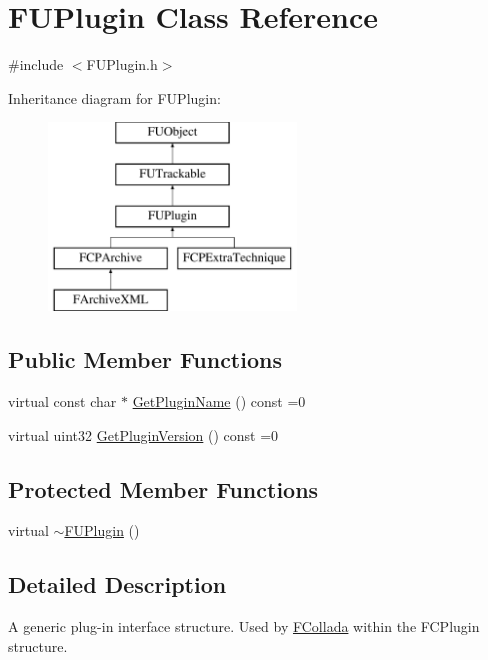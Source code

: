 \hypertarget{classFUPlugin}{
\section{FUPlugin Class Reference}
\label{classFUPlugin}
}


{\ttfamily \#include $<$FUPlugin.h$>$}

Inheritance diagram for FUPlugin:\begin{figure}[H]
\begin{center}
\leavevmode
\includegraphics[height=5.000000cm]{classFUPlugin}
\end{center}
\end{figure}
\subsection*{Public Member Functions}
\begin{DoxyCompactItemize}
\item 
virtual const char $\ast$ \hyperlink{classFUPlugin_a18b5c936391bcc0e44c9d0552ea5f99f}{GetPluginName} () const =0
\item 
virtual uint32 \hyperlink{classFUPlugin_a65f40e837051a381b3922a0db8f871f7}{GetPluginVersion} () const =0
\end{DoxyCompactItemize}
\subsection*{Protected Member Functions}
\begin{DoxyCompactItemize}
\item 
virtual \hyperlink{classFUPlugin_a15533ec6c09ebc9570d1584312565db8}{$\sim$FUPlugin} ()
\end{DoxyCompactItemize}


\subsection{Detailed Description}
A generic plug-\/in interface structure. Used by \hyperlink{namespaceFCollada}{FCollada} within the FCPlugin structure. 

